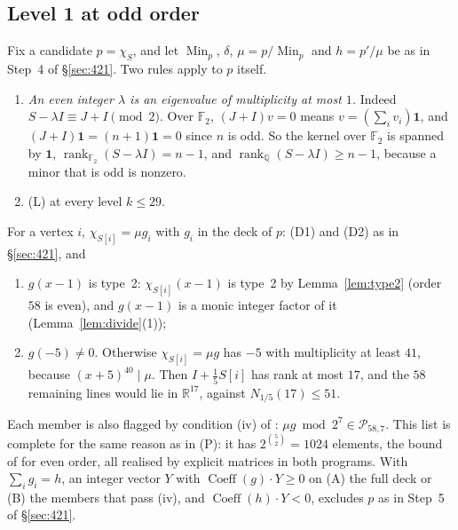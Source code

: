 \documentclass[11pt]{article}
\theoremstyle{definition}
\newcommand{\F}{\mathbb{F}}
\newcommand{\R}{\mathbb{R}}
\newcommand{\Min}{\operatorname{Min}}
\begin{document}
\subsection{Level 1 at odd order}
Fix a candidate $p=\chi_S$, and let $\Min_p$, $\delta$, $\mu=p/\Min_p$ and $h=p'/\mu$ be as in Step~4
of \S\ref{sec:421}. Two rules apply to $p$ itself.
\begin{enumerate}
\item[(F1)] \emph{An even integer $\lambda$ is an eigenvalue of multiplicity at most $1$.} Indeed
$S-\lambda I\equiv J+I\pmod2$. Over $\F_2$, $(J+I)v=0$ means $v=(\sum_iv_i)\mathbf 1$, and
$(J+I)\mathbf 1=(n+1)\mathbf 1=0$ since $n$ is odd. So the kernel over $\F_2$ is spanned by $\mathbf 1$,
$\operatorname{rank}_{\F_2}(S-\lambda I)=n-1$, and $\operatorname{rank}_{\mathbb Q}(S-\lambda I)\ge n-1$,
because a minor that is odd is nonzero.
\item[(F2)] (L) at every level $k\le29$.
\end{enumerate}
For a vertex $i$, $\chi_{S[i]}=\mu g_i$ with $g_i$ in the deck of $p$: (D1) and (D2) as in
\S\ref{sec:421}, and
\begin{enumerate}
\item[(D3)] $g(x-1)$ is type~2: $\chi_{S[i]}(x-1)$ is type~2 by Lemma~\ref{lem:type2} (order $58$ is
even), and $g(x-1)$ is a monic integer factor of it (Lemma~\ref{lem:divide}(1));
\item[(D6)] $g(-5)\ne0$. Otherwise $\chi_{S[i]}=\mu g$ has $-5$ with multiplicity at least $41$, because
$(x+5)^{40}\mid\mu$. Then $I+\frac15S[i]$ has rank at most $17$, and the $58$ remaining lines would
lie in $\R^{17}$, against $N_{1/5}(17)\le51$.
\end{enumerate}
Each member is also flagged by condition (iv) of \cite[\S5]{GSY23}: $\mu g\bmod2^7\in\mathcal P_{58,7}$.
This list is complete for the same reason as in (P): it has $2^{\binom52}=1024$ elements, the bound of
\cite[Cor.~3.4]{GY19} for even order, all realised by explicit matrices in both programs. With
$\sum_ig_i=h$, an integer vector $Y$ with $\operatorname{Coeff}(g)\cdot Y\ge0$ on (A) the full deck or
(B) the members that pass (iv), and $\operatorname{Coeff}(h)\cdot Y<0$, excludes $p$ as in Step~5 of
\S\ref{sec:421}.
\end{document}
